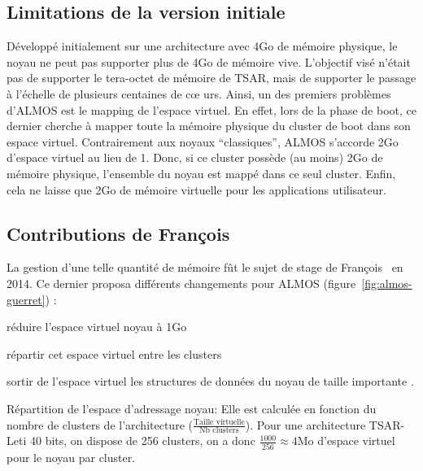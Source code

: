     \subsection{Limitations de la version initiale}

      Développé initialement sur une architecture avec 4Go de mémoire physique,
      le noyau ne peut pas supporter plus de 4Go de mémoire vive. L'objectif
      visé n'était pas de supporter le tera-octet de mémoire de TSAR, mais de
      supporter le passage à l'échelle de plusieurs centaines de c\oe
      urs. Ainsi, un des premiers problèmes d'ALMOS est le mapping de l'espace
      virtuel. En effet, lors de la phase de boot, ce dernier cherche à mapper
      toute la mémoire physique du cluster de boot dans son espace
      virtuel. Contrairement aux noyaux ``classiques'', ALMOS s'accorde 2Go
      d'espace virtuel au lieu de 1. Donc, si ce cluster possède (au moins) 2Go
      de mémoire physique, l'ensemble du noyau est mappé dans ce seul
      cluster. Enfin, cela ne laisse que 2Go de mémoire virtuelle pour les
      applications utilisateur.


    \subsection{Contributions de François \citeauthor{guerret2014exploitation}}

      La gestion d'une telle quantité de mémoire fût le sujet de stage de
      François~\citet{guerret2014exploitation} en 2014. Ce dernier proposa
      différents changements pour ALMOS (figure~\ref{fig:almos-guerret}) :
      \benumline \item réduire l'espace virtuel noyau à 1Go \item répartir cet
      espace virtuel entre les clusters \item sortir de l'espace virtuel les
      structures de données du noyau de taille importante \eenumline.

      \begin{paragraph}{Répartition de l'espace d'adressage noyau:}
        Elle est calculée en fonction du nombre de clusters de l'architecture
        ($\frac{\text{Taille virtuelle}}{\text{Nb clusters}}$). Pour une
        architecture TSAR-Leti 40 bits, on dispose de 256 clusters, on a donc
        $\frac{1000}{256}\approx4$Mo d'espace virtuel pour le noyau par cluster.
      \end{paragraph}

